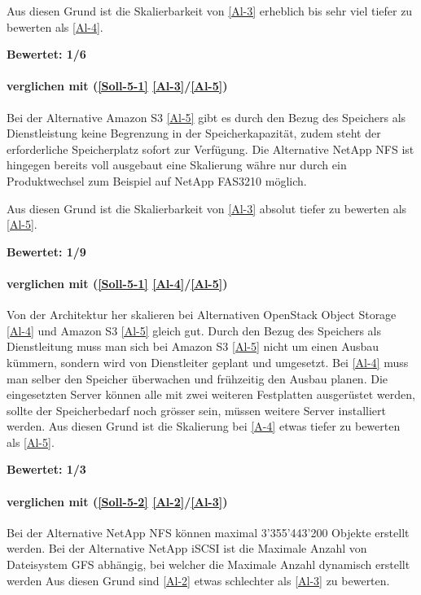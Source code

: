 Aus diesen Grund ist die Skalierbarkeit von  \ref{Al-3} erheblich bis sehr viel tiefer zu bewerten als  \ref{Al-4}.

\textbf{Bewertet: 1/6}

\paragraph*{  verglichen mit  (\ref{Soll-5-1} \ref{Al-3}/\ref{Al-5})}
Bei der Alternative Amazon S3 \ref{Al-5} gibt es durch den Bezug des Speichers als Dienstleistung keine Begrenzung in der Speicherkapazität, zudem steht der erforderliche Speicherplatz sofort zur Verfügung. Die Alternative NetApp NFS ist hingegen bereits voll ausgebaut eine Skalierung währe nur durch ein Produktwechsel zum Beispiel auf NetApp FAS3210 möglich.

Aus diesen Grund ist die Skalierbarkeit von  \ref{Al-3} absolut tiefer zu bewerten als  \ref{Al-5}.

\textbf{Bewertet: 1/9}

\paragraph*{  verglichen mit  (\ref{Soll-5-1} \ref{Al-4}/\ref{Al-5})}
Von der Architektur her skalieren bei Alternativen OpenStack Object Storage \ref{Al-4} und Amazon S3 \ref{Al-5} gleich gut. Durch den Bezug des Speichers als Dienstleitung muss man sich bei Amazon S3 \ref{Al-5} nicht um einen Ausbau kümmern, sondern wird von Dienstleiter geplant und umgesetzt. Bei \ref{Al-4} muss man selber den Speicher überwachen und frühzeitig den Ausbau planen. Die eingesetzten Server können alle mit zwei weiteren Festplatten ausgerüstet werden, sollte der Speicherbedarf noch grösser sein, müssen weitere Server installiert werden. Aus diesen Grund ist die Skalierung bei \ref{A-4} etwas tiefer zu bewerten als \ref{Al-5}.

\textbf{Bewertet: 1/3}


\paragraph*{  verglichen mit  (\ref{Soll-5-2} \ref{Al-2}/\ref{Al-3})}
Bei der Alternative NetApp NFS können maximal 3'355'443'200 Objekte erstellt werden. Bei der Alternative NetApp iSCSI ist die Maximale Anzahl von Dateisystem GFS abhängig, bei welcher die Maximale Anzahl dynamisch erstellt werden Aus diesen Grund sind  \ref{Al-2} etwas schlechter als  \ref{Al-3} zu bewerten.

